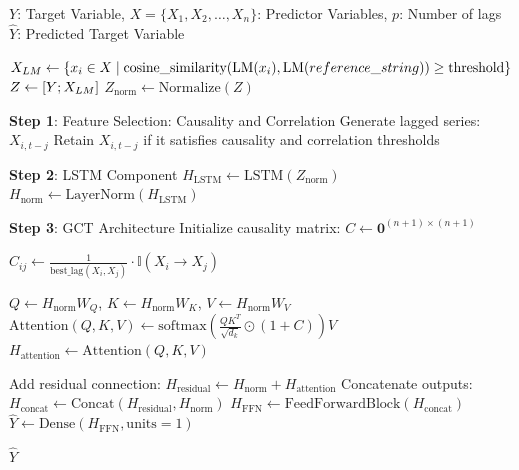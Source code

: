 \documentclass[acmsmall]{acmart}
\begin{document}
\begin{algorithm}[H]
\caption{GCT Training and Inference}
\begin{algorithmic}[1]
\Require $Y$: Target Variable, $X = \{X_1, X_2, \dots, X_n\}$: Predictor Variables, $p$: Number of lags
\Ensure $\hat{Y}$: Predicted Target Variable

\State $X_{{\color{black}LM}} \leftarrow \{ x_i \in X \mid \text{cosine\_similarity}(\text{{\color{black}LM}}(x_i), \text{{\color{black}LM}}({\color{black}reference\_string})) \geq \text{threshold} \}$
\State $Z \leftarrow [Y; X_{{\color{black}LM}}]$
\State $Z_{\text{norm}} \leftarrow \text{Normalize}(Z)$




\vspace{0.2cm}
\State \textbf{Step 1}: {\color{black}Feature Selection:} Causality and Correlation
        \State Generate lagged series: $X_{i,t-j}$
        \State Retain $X_{i,t-j}$ if it satisfies causality and correlation thresholds
    \EndFor
\EndFor

\vspace{0.2cm}
\State \textbf{Step 2}: LSTM {\color{black}Component}
\State $H_{\text{LSTM}} \leftarrow \text{LSTM}(Z_{\text{norm}})$ 
\State $H_{\text{norm}} \leftarrow \text{LayerNorm}(H_{\text{LSTM}})$

\vspace{0.2cm}
\State \textbf{Step 3}: {\color{blue}GCT Architecture}
\State Initialize causality matrix: $C \leftarrow \mathbf{0}^{(n+1) \times (n+1)}$

 
        \State $C_{ij} \leftarrow \frac{1}{\text{best\_lag}(X_i, X_j)} \cdot \mathbb{I}{(X_i \rightarrow X_j)}$
    \EndFor
\EndFor

\State $Q \leftarrow H_{\text{norm}} W_Q$, $K \leftarrow H_{\text{norm}} W_K$, $V \leftarrow H_{\text{norm}} W_V$
\State $\text{Attention}(Q,K,V) \leftarrow \text{softmax}(\frac{Q K^T}{\sqrt{d_k}} \odot (1 + C)) V$
\State $H_{\text{attention}} \leftarrow \text{Attention}(Q,K,V)$

\vspace{0.2cm}
\State Add residual connection: $H_{\text{residual}} \leftarrow H_{\text{norm}} + H_{\text{attention}}$
\State Concatenate outputs: $H_{\text{concat}} \leftarrow \text{Concat}(H_{\text{residual}}, H_{\text{norm}})$
\State $H_{\text{FFN}} \leftarrow \text{FeedForwardBlock}(H_{\text{concat}})$ 
\State $\hat{Y} \leftarrow \text{Dense}(H_{\text{FFN}}, \text{units}=1)$

\Return $\hat{Y}$

\end{algorithmic}
\label{alg:pseudo}
\end{algorithm}
\end{document}
